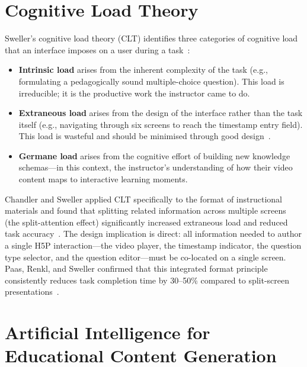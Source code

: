 \section{Cognitive Load Theory}

Sweller's cognitive load theory (CLT) identifies three categories of
cognitive load that an interface imposes on a user during a
task~\cite{sweller1988}:

\begin{itemize}
  \item \textbf{Intrinsic load} arises from the inherent complexity of the
  task (e.g., formulating a pedagogically sound multiple-choice question).
  This load is irreducible; it is the productive work the instructor came
  to do.

  \item \textbf{Extraneous load} arises from the design of the interface
  rather than the task itself (e.g., navigating through six screens to reach
  the timestamp entry field). This load is wasteful and should be minimised
  through good design~\cite{chandler1991}.

  \item \textbf{Germane load} arises from the cognitive effort of building
  new knowledge schemas---in this context, the instructor's understanding of
  how their video content maps to interactive learning moments.
\end{itemize}

Chandler and Sweller applied CLT specifically to the format of instructional
materials and found that splitting related information across multiple
screens (the split-attention effect) significantly increased extraneous load
and reduced task accuracy~\cite{chandler1991}. The design implication is
direct: all information needed to author a single H5P interaction---the
video player, the timestamp indicator, the question type selector, and the
question editor---must be co-located on a single screen. Paas, Renkl, and
Sweller confirmed that this integrated format principle consistently reduces
task completion time by 30--50\% compared to split-screen
presentations~\cite{paas2003}.

\section{Artificial Intelligence for Educational Content Generation}

